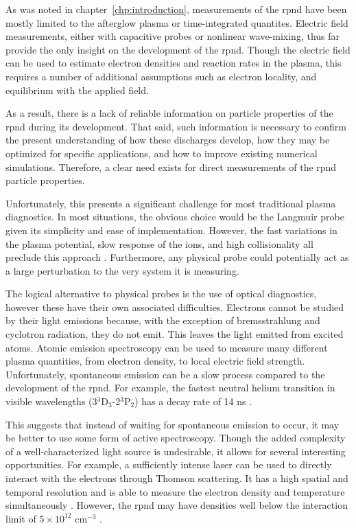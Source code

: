 As was noted in chapter~\ref{chp:introduction}, measurements of the \acs{rpnd}
have been mostly limited to the afterglow plasma or time-integrated quantites.
Electric field measurements, either with capacitive probes or nonlinear
wave-mixing, thus far provide the only insight on the development of the
\acs{rpnd}. Though the electric field can be used to estimate electron densities
and reaction rates in the plasma, this requires a number of additional
assumptions such as electron locality, and equilibrium with the applied field.

As a result, there is a lack of reliable information on particle properties of
the \acs{rpnd} during its development. That said, such information is necessary
to confirm the present understanding of how these discharges develop, how they
may be optimized for specific applications, and how to improve existing
numerical simulations. Therefore, a clear need exists for direct measurements of
the \acs{rpnd} particle properties.

Unfortunately, this presents a significant challenge for most traditional plasma
diagnostics. In most situations, the obvious choice would be the Langmuir probe
given its simplicity and ease of implementation. However, the fast variations in
the plasma potential, slow response of the ions, and high collisionality all
preclude this approach \cite{Lieberman2005}. Furthermore, any physical probe
could potentially act as a large perturbation to the very system it is
measuring.

The logical alternative to physical probes is the use of optical diagnostics,
however these have their own associated difficulties. Electrons cannot be
studied by their light emissions because, with the exception of bremsstrahlung
and cyclotron radiation, they do not emit. This leaves the light emitted from
excited atoms. Atomic emission spectroscopy can be used to measure many
different plasma quantities, from electron density, to local electric field
strength. Unfortunately, spontaneous emission can be a slow process compared to
the development of the \acs{rpnd}. For example, the fastest neutral helium
transition in visible wavelengths (3$^3$D$_3$-2$^3$P$_2^\cdot$) has a decay rate
of 14 ns \cite{Kramida2012}.

This suggests that instead of waiting for spontaneous emission to occur, it may
be better to use some form of active spectroscopy. Though the added complexity
of a well-characterized light source is undesirable, it allows for several
interesting opportunities. For example, a sufficiently intense laser can be used
to directly interact with the electrons through Thomson scattering. It has a
high spatial and temporal resolution and is able to measure the electron density
and temperature simultaneously \cite{VanGessel2012}. However, the \acs{rpnd} may
have densities well below the interaction limit of $5\times10^{12}$ cm$^{-3}$
\cite{Pai2009}.

